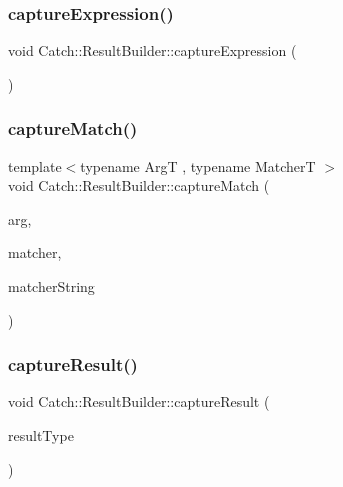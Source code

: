 \mbox{\label{class_catch_1_1_result_builder_af2ae2343965802eeeb0abbd4ea9d2d36}} 
\subsubsection{\texorpdfstring{capture\+Expression()}{captureExpression()}}
{\footnotesize\ttfamily void Catch\+::\+Result\+Builder\+::capture\+Expression (\begin{DoxyParamCaption}{ }\end{DoxyParamCaption})}

\mbox{\label{class_catch_1_1_result_builder_a27425538bec8fee7ac69403c5df6078c}} 
\subsubsection{\texorpdfstring{capture\+Match()}{captureMatch()}}
{\footnotesize\ttfamily template$<$typename ArgT , typename MatcherT $>$ \\
void Catch\+::\+Result\+Builder\+::capture\+Match (\begin{DoxyParamCaption}\item[{ArgT const \&}]{arg,  }\item[{MatcherT const \&}]{matcher,  }\item[{char const $\ast$}]{matcher\+String }\end{DoxyParamCaption})\hspace{0.3cm}{\ttfamily [inline]}}

\mbox{\label{class_catch_1_1_result_builder_a10e467f7b7a4976e5d148b4d5066e8fd}} 
\subsubsection{\texorpdfstring{capture\+Result()}{captureResult()}}
{\footnotesize\ttfamily void Catch\+::\+Result\+Builder\+::capture\+Result (\begin{DoxyParamCaption}\item[{\hyperlink{struct_catch_1_1_result_was_a624e1ee3661fcf6094ceef1f654601ef}{Result\+Was\+::\+Of\+Type}}]{result\+Type }\end{DoxyParamCaption})}

